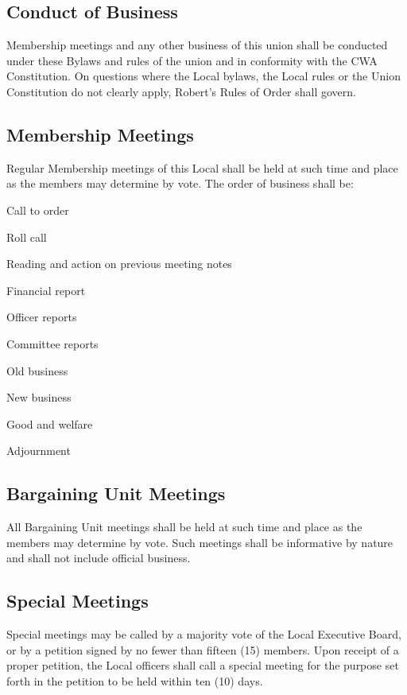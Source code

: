 \documentclass[12pt]{article}
\begin{document}
\subsection{Conduct of Business}
Membership meetings and any other business of this union shall be conducted under these Bylaws and rules of the union and in conformity with the CWA Constitution. On questions where the Local bylaws, the Local rules or the Union Constitution do not clearly apply, Robert's Rules of Order shall govern.

\subsection{Membership Meetings}
Regular Membership meetings of this Local shall be held at such time and place as the members may determine by vote. The order of business shall be:

\begin{numberlist}
\item Call to order
\item Roll call
\item Reading and action on previous meeting notes
\item Financial report
\item Officer reports
\item Committee reports
\item Old business
\item New business
\item Good and welfare
\item Adjournment
\end{numberlist}

\subsection{Bargaining Unit Meetings}
All Bargaining Unit meetings shall be held at such time and place as the members may determine by vote. Such meetings shall be informative by nature and shall not include official business.

\subsection{Special Meetings}\label{special-meetings}
Special meetings may be called by a majority vote of the Local Executive Board, or by a petition signed by no fewer than fifteen (15) members. Upon receipt of a proper petition, the Local officers shall call a special meeting for the purpose set forth in the petition to be held within ten (10) days.
\end{document}
